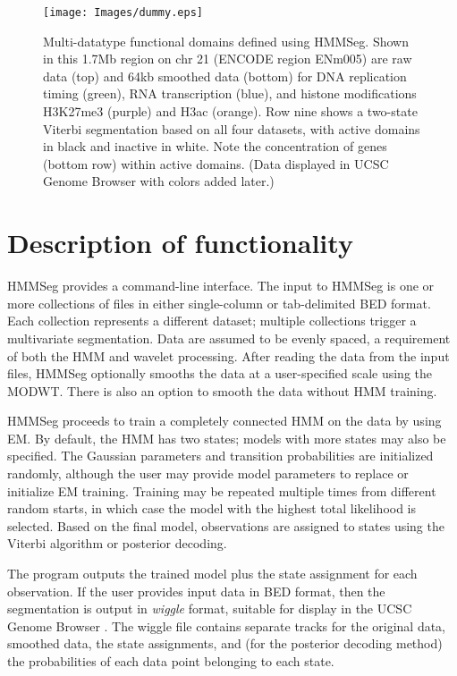 \documentclass{bioinfo}
\begin{document}
\begin{figure}
  \centering
  \texttt{[image: Images/dummy.eps]}
  \caption{Multi-datatype functional domains defined using HMMSeg.
   Shown in this 1.7Mb region on chr 21 (ENCODE region ENm005) are raw
   data (top) and 64kb smoothed data (bottom) for DNA replication
   timing (green), RNA transcription (blue), and histone modifications
   H3K27me3 (purple) and H3ac (orange).  Row nine shows a two-state
   Viterbi segmentation based on all four datasets, with active domains
   in black and inactive in white. Note the concentration of genes
    (bottom row) within active domains. (Data displayed in UCSC Genome
  Browser with colors added later.)}
  \label{ucsc}
\end{figure}

\section{Description of functionality}

HMMSeg provides a command-line interface.  The input to HMMSeg is one
or more collections of files in either single-column or tab-delimited
BED format.  Each collection represents a different dataset; multiple
collections trigger a multivariate segmentation.  Data are assumed to
be evenly spaced, a requirement of both the HMM and wavelet
processing.  After reading the data from the input files, HMMSeg
optionally smooths the data at a user-specified scale using the MODWT.
There is also an option to smooth the data without HMM training.

HMMSeg proceeds to train a completely connected HMM on the data by using
EM.  By default, the HMM has two states; models with more states may
also be specified.  The Gaussian parameters and transition
probabilities are initialized randomly, although the user may provide
model parameters to replace or initialize EM training.  Training may
be repeated multiple times from different random starts, in which case
the model with the highest total likelihood is 
selected.  Based on the final model, observations are assigned to
states using the Viterbi algorithm or posterior decoding.

The program outputs the trained model plus the state assignment for
each observation.  If the user provides input data in BED format, then
the segmentation is output in {\it wiggle} format, suitable for
display in the UCSC Genome Browser \citep{kent:human}.  The wiggle
file contains separate tracks for the original data, smoothed data,
the state assignments, and (for the posterior decoding method) the
probabilities of each data point belonging to each state.
\end{document}
